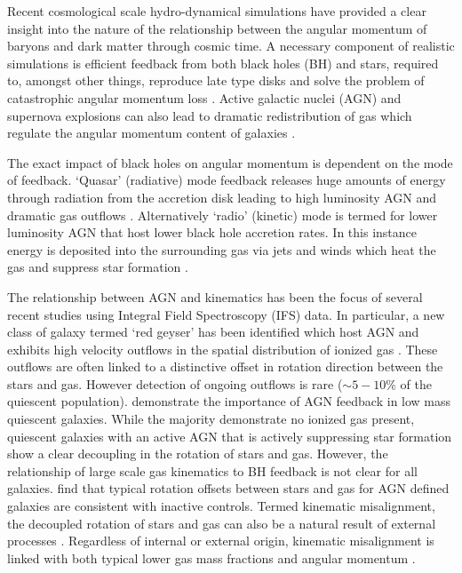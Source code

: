 \documentclass[fleqn,usenatbib]{mnras}
\begin{document}
Recent cosmological scale hydro-dynamical simulations have provided a clear insight into the nature of the relationship between the angular momentum of baryons and dark matter through cosmic time. A necessary component of realistic simulations is efficient feedback from both black holes (BH) and stars, required to, amongst other things, reproduce late type disks and solve the problem of catastrophic angular momentum loss \citep[e.g.][]{zavala2008, scannapieco2009}. Active galactic nuclei (AGN) and supernova explosions can also lead to dramatic redistribution of gas which regulate the angular momentum content of galaxies \citep[e.g.][]{genel2015, DeFelippis2017}. 

The exact impact of black holes on angular momentum is dependent on the mode of feedback. `Quasar' (radiative) mode feedback releases huge amounts of energy through radiation from the accretion disk leading to high luminosity AGN and dramatic gas outflows \citep[e.g.][]{cattaneo2009, rubin2014, cheung2016}. Alternatively `radio' (kinetic) mode is termed for lower luminosity AGN that host lower black hole accretion rates. In this instance energy is deposited into the surrounding gas via jets and winds which heat the gas and suppress star formation \citep[][]{binney1995, ciotti2001, heckman2014}.

The relationship between AGN and kinematics has been the focus of several recent studies using Integral Field Spectroscopy (IFS) data. In particular, a new class of galaxy termed `red geyser' has been identified which host AGN and exhibits high velocity outflows in the spatial distribution of ionized gas \citep[][]{cheung2016, roy2018}. These outflows are often linked to a distinctive offset in rotation direction between the stars and gas. However detection of ongoing outflows is rare ($\sim5-10$\% of the quiescent population). \citet{penny2018} demonstrate the importance of AGN feedback in low mass quiescent galaxies. While the majority demonstrate no ionized gas present, quiescent galaxies with an active AGN that is actively suppressing star formation show a clear decoupling in the rotation of stars and gas. However, the relationship of large scale gas kinematics to BH feedback is not clear for all galaxies. \citet{ilha2019} find that typical rotation offsets between stars and gas for AGN defined galaxies are consistent with inactive controls. Termed kinematic misalignment, the decoupled rotation of stars and gas can also be a natural result of external processes \cite[e.g.][]{davis2011, barrera2015, vdvoort2015, jin2016}. Regardless of internal or external origin, kinematic misalignment is linked with both typical lower gas mass fractions and angular momentum \citep[e.g. ][]{duckworth2019,starkenburg+19}. 
\end{document}
